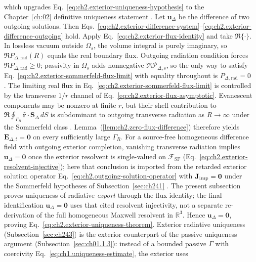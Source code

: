 which upgrades Eq.~\eqref{eq:ch2.exterior-uniqueness-hypothesis} to the Chapter~\ref{ch:02}
definitive uniqueness statement \cite{stratton1941}.
Let \(\mathbf{u}_\Delta\) be the difference of two outgoing solutions. Then
Eqs.~\eqref{eq:ch2.exterior-difference-system}--\eqref{eq:ch2.exterior-difference-outgoing}
hold. Apply Eq.~\eqref{eq:ch2.exterior-flux-identity} and take
\(\Re\{\cdot\}\). In lossless vacuum outside \(\Omega_s\), the volume integral is
purely imaginary, so \(\Re P_{\Delta,\mathrm{rad}}(R)\) equals the real boundary flux.
Outgoing radiation condition forces \(\Re P_{\Delta,\mathrm{rad}}\ge 0\); passivity in
\(\Omega_s\) adds nonnegative \(\Re\mathcal{P}_{\Delta,s}\), so the only way to
satisfy Eq.~\eqref{eq:ch2.exterior-sommerfeld-flux-limit} with equality throughout is
\(P_{\Delta,\mathrm{rad}}=0\) \cite{stratton1941}.
The limiting real flux in Eq.~\eqref{eq:ch2.exterior-sommerfeld-flux-limit} is controlled by the
transverse $1/r$ channel of Eq.~\eqref{eq:ch2.exterior-flux-asymptotic}.
Evanescent components may be nonzero at finite $r$, but their shell contribution to
$\Re\oint_{\Gamma_R}\hat{\mathbf{r}}\cdot\mathbf{S}_\Delta\,dS$ is subdominant to outgoing
transverse radiation as $R\to\infty$ under the Sommerfeld class
\cite{sommerfeld1949,harrington2001}.
Lemma~(\ref{lem:ch2.zero-flux-difference}) therefore yields $\mathbf{E}_{\Delta,t}=\mathbf{0}$ on
every sufficiently large $\Gamma_R$.
For a source-free homogeneous difference field with outgoing exterior completion, vanishing
transverse radiation implies $\mathbf{u}_\Delta=\mathbf{0}$ once the exterior resolvent is
single-valued on $\mathcal{F}_{\mathrm{SF}}$ (Eq.~\eqref{eq:ch2.exterior-resolvent-injective});
here that conclusion is imported from the retarded exterior solution operator
Eq.~\eqref{eq:ch2.outgoing-solution-operator} with $\mathbf{J}_{\mathrm{imp}}=\mathbf{0}$ under the Sommerfeld
hypotheses of Subsection~\ref{sec:ch241} \cite{stratton1941,sommerfeld1949}.
The present subsection proves uniqueness of radiative \emph{export} through the flux identity;
the final identification $\mathbf{u}_\Delta=\mathbf{0}$ uses that cited resolvent injectivity, not a separate
re-derivation of the full homogeneous Maxwell resolvent in $\mathbb{R}^{3}$.
Hence
\(\mathbf{u}_\Delta=\mathbf{0}\), proving Eq.~\eqref{eq:ch2.exterior-uniqueness-theorem}.
Exterior radiative uniqueness (Subsection~\ref{sec:ch243}) is the exterior counterpart of
the passive uniqueness argument (Subsection~\ref{sec:ch01.1.3}): instead of a bounded passive
\(\Gamma\) with coercivity Eq.~\eqref{eq:ch1.uniqueness-estimate}, the exterior uses
